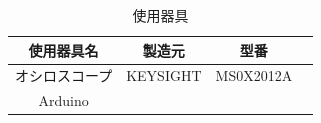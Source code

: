 \begin{table}[H]
  \centering
  \caption{使用器具}
  \label{tab:kigu}
  \begin{tabular}{|c|c|c|c|}
    \hline
    使用器具名 & 製造元 & 型番\\
    \hline
    オシロスコープ&KEYSIGHT & MS0X2012A\\
    Arduino &   & \\
    \hline
  \end{tabular}
\end{table}
